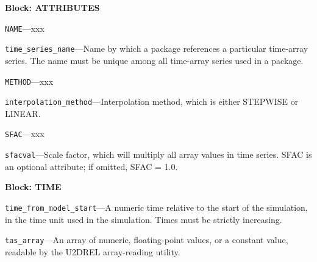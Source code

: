 
\item \textbf{Block: ATTRIBUTES}

\begin{description}
\item \texttt{NAME}---xxx

\item \texttt{time\_series\_name}---Name by which a package references a particular time-array series. The name must be unique among all time-array series used in a package.

\item \texttt{METHOD}---xxx

\item \texttt{interpolation\_method}---Interpolation method, which is either STEPWISE or LINEAR.

\item \texttt{SFAC}---xxx

\item \texttt{sfacval}---Scale factor, which will multiply all array values in time series. SFAC is an optional attribute; if omitted, SFAC = 1.0.

\end{description}
\item \textbf{Block: TIME}

\begin{description}
\item \texttt{time\_from\_model\_start}---A numeric time relative to the start of the simulation, in the time unit used in the simulation. Times must be strictly increasing.

\item \texttt{tas\_array}---An array of numeric, floating-point values, or a constant value, readable by the U2DREL array-reading utility.

\end{description}

